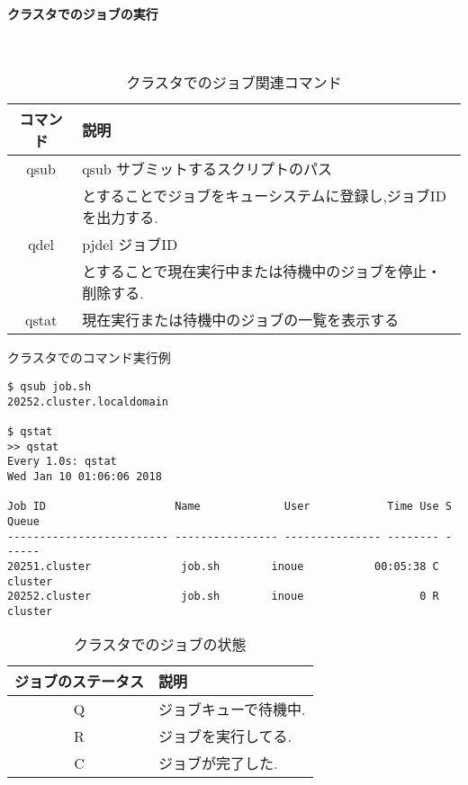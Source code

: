 \paragraph{クラスタでのジョブの実行}~\\
\begin{table}[htb]
  \caption {クラスタでのジョブ関連コマンド}
  \begin{center}
    \begin{tabular}{|c|p{12cm}|}
      \hline
      コマンド & 説明 \\ \hline
      qsub & qsub サブミットするスクリプトのパス\\
           & とすることでジョブをキューシステムに登録し,ジョブIDを出力する.\\ \hline
      qdel & pjdel ジョブID\\
           & とすることで現在実行中または待機中のジョブを停止・削除する.\\ \hline
      qstat & 現在実行または待機中のジョブの一覧を表示する\\ \hline
    \end{tabular}
  \end{center}
\end{table}
\clearpage

{\footnotesize

}
\vspace{1cm}
\begin{table}[htb]
  \caption {クラスタでのコマンド実行例}
{\footnotesize
\begin{framed}
\begin{verbatim}
$ qsub job.sh
20252.cluster.localdomain

$ qstat
>> qstat
Every 1.0s: qstat                                                                                                                                            Wed Jan 10 01:06:06 2018

Job ID                    Name             User            Time Use S Queue
------------------------- ---------------- --------------- -------- - -----
20251.cluster              job.sh        inoue           00:05:38 C cluster
20252.cluster              job.sh        inoue                  0 R cluster
\end{verbatim}
\end{framed}
}
\end{table}
\clearpage
\begin{table}[htb]
  \caption {クラスタでのジョブの状態}
  \begin{center}
    \begin{tabular}{|c|p{12cm}|}
      \hline
      ジョブのステータス & 説明 \\ \hline
      Q & ジョブキューで待機中.\\ \hline
      R & ジョブを実行してる.\\ \hline
      C & ジョブが完了した.\\ \hline
    \end{tabular}
  \end{center}
\end{table}
